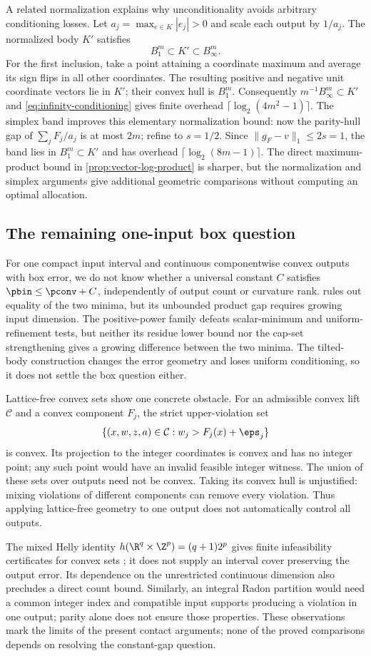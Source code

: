 A related normalization explains why unconditionality avoids arbitrary
conditioning losses. Let $a_j=\max_{e\in K}|e_j|>0$ and scale each
output by $1/a_j$. The normalized body $K'$ satisfies
\[
 B_1^m\subset K'\subset B_\infty^m.
\]
For the first inclusion, take a point attaining a coordinate maximum and
average its sign flips in all other coordinates. The resulting positive
and negative unit coordinate vectors lie in $K'$; their convex hull
is $B_1^m$. Consequently $m^{-1}B_\infty^m\subset K'$ and
\eqref{eq:infinity-conditioning} gives finite overhead
$\lceil\log_2(4m^2-1)\rceil$. The simplex band improves this elementary
normalization bound: now the parity-hull gap of $\sum_jF_j/a_j$ is at
most $2m$; refine to $s=1/2$. Since
$\|g_F-v\|_1\le2s=1$, the band lies in $B_1^m\subset K'$ and
has overhead $\lceil\log_2(8m-1)\rceil$.
The direct maximum-product bound in \cref{prop:vector-log-product}
is sharper, but the normalization and simplex arguments give additional
geometric comparisons without computing an optimal allocation.

\subsection{The remaining one-input box question}\label{subsec:one-input-open}

For one compact input interval and continuous componentwise convex outputs
with box error, we do not know whether a universal constant $C$
satisfies $\pbin\le\pconv+C$, independently of output count or
curvature rank.  rules out equality of the two
minima, but its unbounded product gap requires growing input dimension.
The positive-power family defeats scalar-minimum and uniform-refinement
tests, but neither its residue lower bound nor the cap-set strengthening
gives a growing difference between the two minima. The tilted-body
construction changes the error geometry and loses uniform conditioning,
so it does not settle the box question either.

Lattice-free convex sets show one concrete obstacle.
For an admissible convex lift $\mathcal C$ and a convex component $F_j$,
the strict upper-violation set
\[
 \{(x,w,z,a)\in\mathcal C:w_j>F_j(x)+\eps_j\}
\]
is convex. Its projection to the integer coordinates is convex and has
no integer point; any such point would have an invalid feasible integer
witness. The union of these sets over outputs need not be convex.
Taking its convex hull is unjustified: mixing violations of different
components can remove every violation. Thus applying lattice-free
geometry to one output does not automatically control all outputs.

The mixed Helly identity
$h(\R^q\times\Z^p)=(q+1)2^p$ gives finite infeasibility certificates
for convex sets \citep[Theorem 1.1]{averkov2012}; it does not supply an
interval cover preserving the output error. Its dependence on the
unrestricted continuous dimension also precludes a direct count bound.
Similarly, an integral Radon partition would need a common integer index
and compatible input supports producing a violation in one output;
parity alone does not ensure those properties. These observations mark
the limits of the present contact arguments; none of the proved
comparisons depends on resolving the constant-gap question.
